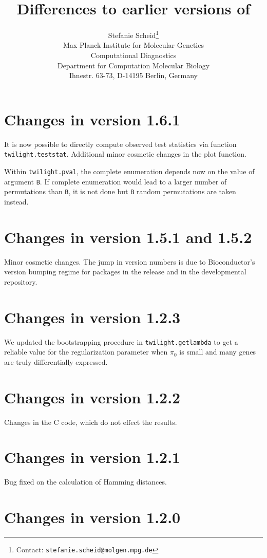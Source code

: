 \documentclass[11pt,a4paper,fleqn]{article}
\title{Differences to earlier versions of \Rpackage{twilight}}
\author{Stefanie Scheid\footnote{Contact:
        \texttt{stefanie.scheid@molgen.mpg.de}}\bigskip \\
        Max Planck Institute for Molecular Genetics\\
         Computational Diagnostics\\ Department for Computation Molecular Biology \\
         Ihnestr. 63-73, D-14195 Berlin, Germany}
\date{}
\newcommand{\Rfunction}[1]{{\texttt{#1}}}
\newcommand{\Rfunarg}[1]{{\texttt{#1}}}
\begin{document}
\maketitle

\section{Changes in version 1.6.1}

It is now possible to directly compute observed test statistics via function \Rfunction{twilight.teststat}. Additional minor cosmetic changes in the plot function. 

Within \Rfunction{twilight.pval}, the complete enumeration depends now on the value of argument \Rfunarg{B}. If complete enumeration would lead to a larger number of permutations than \Rfunarg{B}, it is not done but \Rfunarg{B} random permutations are taken instead.

\section{Changes in version 1.5.1 and 1.5.2}

Minor cosmetic changes. The jump in version numbers is due to Bioconductor's version bumping regime for packages in the release and in the developmental repository.


\section{Changes in version 1.2.3}

We updated the bootstrapping procedure in \Rfunction{twilight.getlambda} to get a reliable value for the regularization parameter when $\pi_0$ is small and many genes are truly differentially expressed.


\section{Changes in version 1.2.2}

Changes in the C code, which do not effect the results.


\section{Changes in version 1.2.1}

Bug fixed on the calculation of Hamming distances.


\section{Changes in version 1.2.0}
\end{document}
